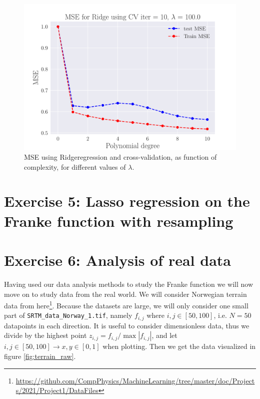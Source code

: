 \documentclass[reprint,english,notitlepage,aps,nobalancelastpage,nofootinbib]{revtex4-1}  %
\begin{document}
\begin{figure}[H]
	\endminipage\hfill
	\includegraphics[width=\linewidth]{MSE_Ridge_n30_eps02_pol10_CV_re10_lam_100_0.pdf}
	\endminipage
	\caption{MSE using Ridgeregression and cross-validation, as function of complexity, for different values of $\lambda$.} \label{fig:Ridge_CV_PM}
\end{figure}


\section*{Exercise 5: Lasso regression on the Franke function with resampling}


\section*{Exercise 6: Analysis of real data}

Having used our data analysis methods to study the Franke function we will now move on to study data from the real world. We will consider Norwegian terrain data from here\footnote{\href{https://github.com/CompPhysics/MachineLearning/tree/master/doc/Projects/2021/Project1/DataFiles}{https://github.com/CompPhysics/MachineLearning/tree/master/doc/Projects/2021/Project1/DataFiles}}. Because the datasets are large, we will only consider one small part of \texttt{SRTM\_data\_Norway\_1.tif}, namely $f_{i,j}$ where $i,j\in[50,100]$, i.e. $N=50$ datapoints in each direction. It is useful to consider dimensionless data, thus we divide by the highest point $z_{i,j} = f_{i,j}/\max{|f_{i,j}|}$, and let $i,j\in[50,100] \rightarrow x,y\in[0,1]$ when plotting. Then we get the data visualized in figure \ref{fig:terrain_raw}.
\end{document}
